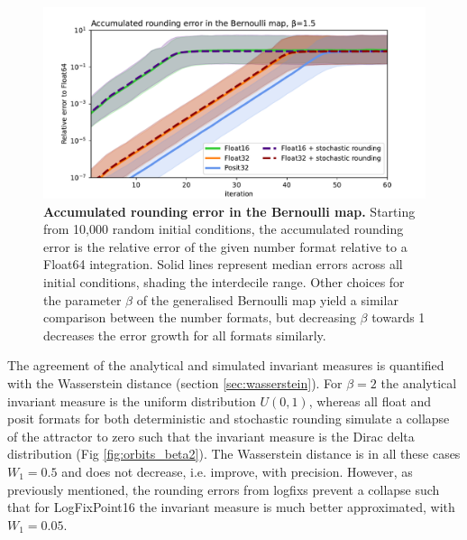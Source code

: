\begin{figure}[tbhp]
	\includegraphics[width=1\textwidth]{Figures/orbits/error_growth.pdf}
	\caption{\textbf{Accumulated rounding error in the Bernoulli map.}
	Starting from 10,000 random initial conditions, the accumulated rounding error is the relative error of the
	given number format relative to a Float64 integration. Solid lines represent median errors across all
	initial conditions, shading the interdecile range. Other choices for the parameter $\beta$ of the generalised
	Bernoulli map yield a similar comparison between the number formats, but decreasing $\beta$ towards 1
	decreases the error growth for all formats similarly.}
	\label{fig:orbits_error_growth}
\end{figure}

The agreement of the analytical and simulated invariant measures is quantified with the Wasserstein distance (section \ref{sec:wasserstein}).
For $\beta=2$ the analytical invariant measure is the uniform distribution $U(0,1)$, whereas all float and posit formats for both deterministic
and stochastic rounding simulate a collapse of the attractor to zero such that the invariant measure is the Dirac delta distribution
(Fig \ref{fig:orbits_beta2}). The Wasserstein distance is in all these cases $W_1 = 0.5$ and does not decrease, i.e. improve, with precision.
However, as previously mentioned, the rounding errors from logfixs prevent a collapse such that for LogFixPoint16 the invariant measure is
much better approximated, with $W_1 = 0.05$.

